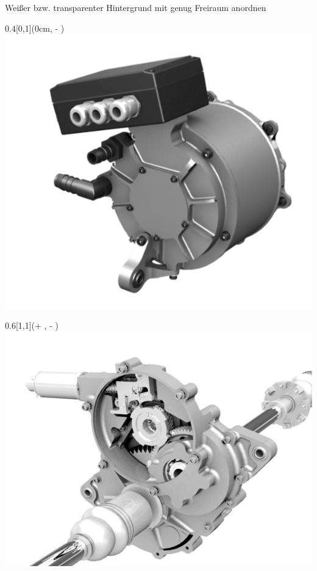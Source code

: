 \begin{frame}
    
    Weißer bzw. transparenter Hintergrund\newline
    mit genug Freiraum anordnen


\begin{textblock*}{0.4\paperwidth}[0,1](0cm, \textheight - \PraesentationSeitenrand)%
\includegraphics[width=0.4\paperwidth]{./Resources/Presentation/Images/Motor.png}
\end{textblock*}

\begin{textblock*}{0.6\paperwidth}[1,1](\textwidth + \PraesentationSeitenrand, \textheight - \PraesentationSeitenrand)%
\includegraphics[width=0.6\paperwidth]{./Resources/Presentation/Images/Getriebe.png}
\end{textblock*}

\end{frame}
\clearpage


